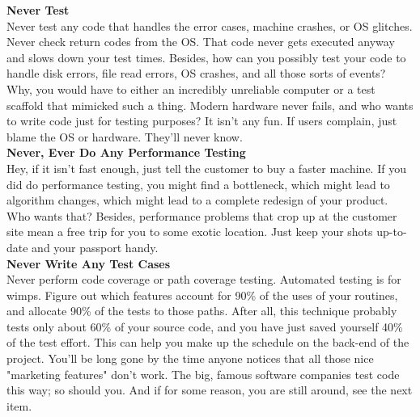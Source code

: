 \documentclass[11pt,twoside,a4paper]{article}
\begin{document}
\textbf{Never Test}~\\
Never test any code that handles the error cases, machine crashes, or OS glitches. Never check return codes from the OS. That code never gets executed anyway and slows down your test times. Besides, how can you possibly test your code to handle disk errors, file read errors, OS crashes, and all those sorts of events? Why, you would have to either an incredibly unreliable computer or a test scaffold that mimicked such a thing. Modern hardware never fails, and who wants to write code just for testing purposes? It isn't any fun. If users complain, just blame the OS or hardware. They'll never know.~\\ 

\textbf{Never, Ever Do Any Performance Testing}~\\
Hey, if it isn't fast enough, just tell the customer to buy a faster machine. If you did do performance testing, you might find a bottleneck, which might lead to algorithm changes, which might lead to a complete redesign of your product. Who wants that? Besides, performance problems that crop up at the customer site mean a free trip for you to some exotic location. Just keep your shots up-to-date and your passport handy. ~\\

\textbf{Never Write Any Test Cases}~\\
Never perform code coverage or path coverage testing. Automated testing is for wimps. Figure out which features account for 90\% of the uses of your routines, and allocate 90\% of the tests to those paths. After all, this technique probably tests only about 60\% of your source code, and you have just saved yourself 40\% of the test effort. This can help you make up the schedule on the back-end of the project. You'll be long gone by the time anyone notices that all those nice "marketing features" don't work. The big, famous software companies test code this way; so should you. And if for some reason, you are still around, see the next item.~\\ 
\end{document}
